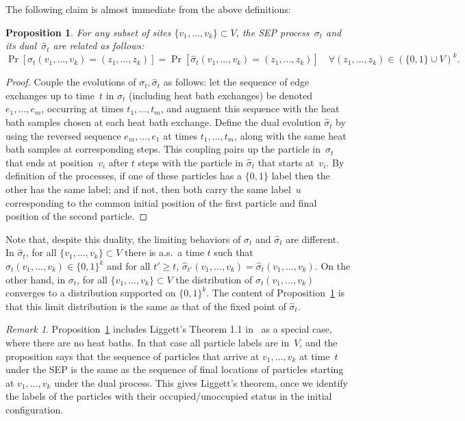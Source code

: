 \documentclass[11pt]{article}
\theoremstyle{plain}
\newtheorem{proposition}[theorem]{Proposition}
\theoremstyle{definition}
\theoremstyle{remark}
\newtheorem{remark}[theorem]{Remark}
\numberwithin{equation}{section}
\begin{document}
The following claim is almost immediate from the above definitions:
\begin{proposition} \label{prop:duality}
For any subset of sites $\{v_1,\ldots,v_k\}\subset V$, the SEP process~$\sigma_t$ 
and its dual~$\hat\sigma_t$ are related as follows:
\begin{equation*}
   \Pr[\sigma_t(v_1,\ldots,v_k)=(z_1,\ldots,z_k)] = 
   \Pr[\hat\sigma_t(v_1,\ldots,v_k)=(z_1,\ldots,z_k)]\quad\forall (z_1,\ldots,z_k)\in(\{0,1\}\cup V)^k.  
\end{equation*}   
\end{proposition}
\begin{proof} Couple the evolutions of $\sigma_t,\hat\sigma_t$ as follows: let the
sequence of edge exchanges up to time~$t$ in $\sigma_t$ (including heat bath exchanges)
be denoted $e_1,\ldots,e_m$, occurring at times $t_1,\ldots,t_m$, and augment this
sequence with the heat bath samples chosen at each heat bath exchange.  Define
the dual evolution $\hat\sigma_t$ by using the reversed sequence $e_m,\ldots,e_1$
at times $t_1,\ldots,t_m$, along
with the same heat bath samples at corresponding steps.  This coupling pairs up
the particle in~$\sigma_t$ that ends at position~$v_i$ after $t$ steps with the
particle in $\hat\sigma_t$ that starts at~$v_i$.  By definition of the processes, if one of these
particles has a $\{0,1\}$ label then the other has the same label; and if not, then both 
carry the same label~$u$ corresponding to the common initial position of the first
particle and final position of the second particle.
\end{proof}

Note that, despite this duality, the limiting behaviors of $\sigma_t$ and $\hat\sigma_t$ are different. In
$\hat\sigma_t$, for all $\{v_1,\ldots,v_k\}\subset V$ there is a.s.\ a time $t$ such that
$\hat\sigma_t(v_1,\ldots,v_k)\in \{0,1\}^k$ and for all $t'\geq t$, 
$\hat\sigma_{t'}(v_1,\ldots,v_k)=\hat\sigma_t(v_1,\ldots,v_k)$. On the other hand, in $\sigma_t$, 
for all $\{v_1,\ldots,v_k\}\subset V$ the distribution of $\sigma_t(v_1,\ldots,v_k)$ converges to a
distribution supported on $\{0,1\}^k$.  The content of Proposition~\ref{prop:duality} is that this limit distribution
is the same as that of the fixed point of $\hat\sigma_t$.

\begin{remark}
Proposition~\ref{prop:duality} includes Liggett's Theorem 1.1 in~\cite[Chapter VIII]{Liggett85} as a special case,
where there are no heat baths.  In that case all particle labels are in~$V$, and the proposition
says that the sequence of particles that arrive at
$v_1,\ldots,v_k$ at time~$t$ under the SEP is the same as the sequence of
final locations of particles starting at $v_1,\ldots,v_k$ under the dual process.
This gives Liggett's theorem, once we identify the labels of the particles with their
occupied/unoccupied status in the initial configuration.
\end{remark}
\end{document}
